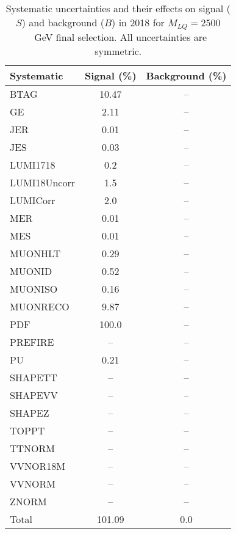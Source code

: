 \begin{table}[htbp]
\begin{center}
\caption{Systematic uncertainties and their effects on signal ($S$) and background ($B$) in 2018 for $M_{LQ}=2500$~GeV final selection. All uncertainties are symmetric.}
\begin{tabular}{lcc}
\hline\hline
Systematic & Signal (\%) & Background (\%) \\ \hline 
BTAG & 10.47 & --\\ 
GE & 2.11 & --\\ 
JER & 0.01 & --\\ 
JES & 0.03 & --\\ 
LUMI1718 & 0.2 & --\\ 
LUMI18Uncorr & 1.5 & --\\ 
LUMICorr & 2.0 & --\\ 
MER & 0.01 & --\\ 
MES & 0.01 & --\\ 
MUONHLT & 0.29 & --\\ 
MUONID & 0.52 & --\\ 
MUONISO & 0.16 & --\\ 
MUONRECO & 9.87 & --\\ 
PDF & 100.0 & --\\ 
PREFIRE & -- & --\\ 
PU & 0.21 & --\\ 
SHAPETT & -- & --\\ 
SHAPEVV & -- & --\\ 
SHAPEZ & -- & --\\ 
TOPPT & -- & --\\ 
TTNORM & -- & --\\ 
VVNOR18M & -- & --\\ 
VVNORM & -- & --\\ 
ZNORM & -- & --\\ 
Total & 101.09 & 0.0\\ \hline \hline
\end{tabular}
\label{tab:SysUncertainties_uujj_2500}
\end{center}
\end{table}

